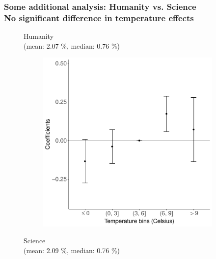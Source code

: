 \documentclass[10pt, pdfmx,hiresbb]{beamer}
\begin{document}
\begin{frame}\frametitle{Some additional analysis: Humanity vs. Science \\ {\small No significant difference in temperature effects}}
  \begin{figure}
    \center
    \begin{minipage}{0.43\textwidth}
      \begin{center}
        Humanity \\
        {\small (mean: 2.07 \%, median: 0.76 \%)}
      \end{center}
      \begin{figure}[h]
        \centering
        \includegraphics[width = \textwidth]{../Output/images/reg_major_2.pdf}
      \end{figure}
    \end{minipage}
    \begin{minipage}{0.43\textwidth}
      \begin{center}
        Science \\
        {\small (mean: 2.09 \%, median: 0.76 \%)}
      \end{center}
      \begin{figure}[h]

\end{figure}
\end{minipage}
\end{figure}
\end{frame}
\end{document}
